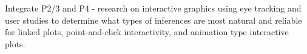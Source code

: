 \documentclass[11pt,letterpaper,sans,unicode]{moderncv}        %
\begin{document}
\vspace{.65cm}\hspace{8pt}Integrate P2/3 and P4 - research on interactive graphics using eye tracking and user studies to determine what types of inferences are most natural and reliable for linked plots, point-and-click interactivity, and animation type interactive plots. 

\end{document}
